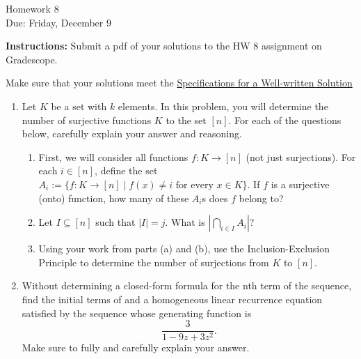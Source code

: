 \documentclass[12pt]{article}
\begin{document}
\begin{center}
{\Large Homework 8}\\
Due: Friday, December 9\\
\end{center}
{\bf Instructions:} Submit a pdf of your solutions to the HW 8 assignment on Gradescope. 

Make sure that your solutions meet the \href{https://docs.google.com/document/d/18LfQoqi6BsY2VdAlpC5xdYEA2rxSGoH0891nVec4_Os/edit?usp=sharing}{Specifications for a Well-written Solution} 

\begin{enumerate}
\item Let $K$ be a set with $k$ elements. In this problem, you will determine the number of surjective functions $K$ to the set $[n]$.  For each of the questions below, carefully explain your answer and reasoning. 
\begin{enumerate}
\item First, we will consider all functions $f:K\to [n]$ (not just surjections). For each $i\in [n]$, define the set $A_i:=\{f:K\to [n]\mid f(x)\ne i \text{ for every } x\in K\}$.  If $f$ is a surjective (onto) function, how many of these $A_i$s does $f$ belong to? 
\item Let $I\subseteq [n]$ such that $|I|=j$. What is $|\bigcap_{i\in I} A_i|$?
\item Using your work from parts (a) and (b), use the Inclusion-Exclusion Principle to determine the number of surjections from $K$ to $[n]$. 
\end{enumerate} 

\item Without determining a closed-form formula for the nth term of the sequence, find the initial terms of and a homogeneous linear recurrence equation satisfied by the sequence whose generating function is 
$$\frac{3}{1-9z+3z^2}.$$ Make sure to fully and carefully explain your answer. 

\end{enumerate}
\end{document}
